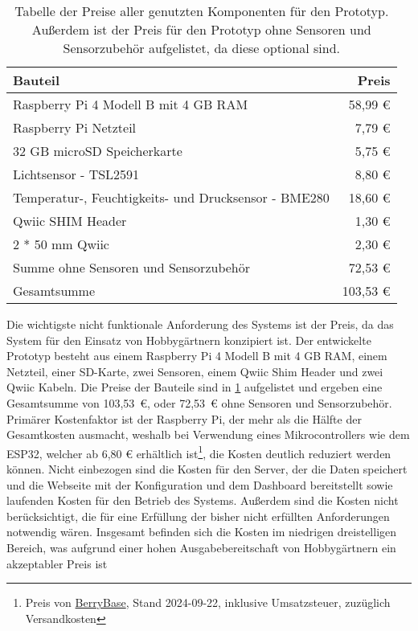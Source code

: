 \begin{table}[!htbp]
	\centering
	\caption[Preise aller genutzten Komponenten für den Prototyp.]{
		Tabelle der Preise aller genutzten Komponenten für den Prototyp.\footnotemark
		Außerdem ist der Preis für den Prototyp ohne Sensoren und Sensorzubehör aufgelistet, da diese optional sind.
	}\label{tab:prototyp-preis}
	\begin{tabular}{lr}
		Bauteil & Preis \\\hline
		Raspberry Pi 4 Modell B mit 4 GB RAM					&  58,99 € \\
		Raspberry Pi Netzteil									&   7,79 € \\
		32 GB microSD Speicherkarte								&   5,75 € \\
		Lichtsensor - TSL2591									&   8,80 € \\
		Temperatur-, Feuchtigkeits- und Drucksensor - BME280	&  18,60 € \\
		Qwiic SHIM Header										&   1,30 € \\
		2 * 50 mm Qwiic											&   2,30 € \\\hline
		Summe ohne Sensoren und Sensorzubehör					&  72,53 € \\
		Gesamtsumme												& 103,53 € \\
	\end{tabular}
\end{table}


Die wichtigste nicht funktionale Anforderung des Systems ist der Preis, da das System für den Einsatz von Hobbygärtnern konzipiert ist.
Der entwickelte Prototyp besteht aus einem Raspberry Pi 4 Modell B mit 4 GB RAM, einem Netzteil, einer SD-Karte, zwei Sensoren, einem Qwiic Shim Header und zwei Qwiic Kabeln.
Die Preise der Bauteile sind in \cref{tab:prototyp-preis} aufgelistet und ergeben eine Gesamtsumme von 103,53~€, oder 72,53~€ ohne Sensoren und Sensorzubehör.
Primärer Kostenfaktor ist der Raspberry Pi, der mehr als die Hälfte der Gesamtkosten ausmacht, weshalb bei Verwendung eines Mikrocontrollers wie dem ESP32, welcher ab 6,80 € erhältlich ist\footnote{Preis von \href{https://www.berrybase.de}{BerryBase}, Stand 2024-09-22, inklusive Umsatzsteuer, zuzüglich Versandkosten}, die Kosten deutlich reduziert werden können.
Nicht einbezogen sind die Kosten für den Server, der die Daten speichert und die Webseite mit der Konfiguration und dem Dashboard bereitstellt sowie laufenden Kosten für den Betrieb des Systems.
Außerdem sind die Kosten nicht berücksichtigt, die für eine Erfüllung der bisher nicht erfüllten Anforderungen notwendig wären.
Insgesamt befinden sich die Kosten im niedrigen dreistelligen Bereich, was aufgrund einer hohen Ausgabebereitschaft von Hobbygärtnern ein akzeptabler Preis ist~\cite{AusgabebereitschaftGarten}

